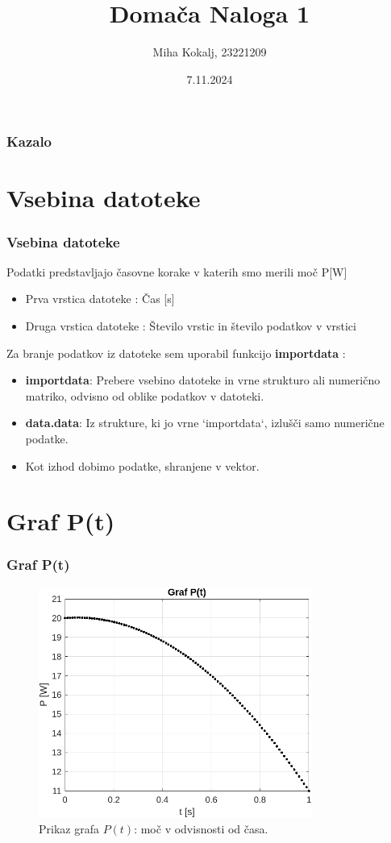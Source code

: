 \documentclass[10pt]{beamer}
\title{Domača Naloga 1}
\author{Miha Kokalj, 23221209}
\institute{Fakulteta za strojništvo, Univerza v Ljubljani}
\date{7.11.2024}
\begin{document}
 
\frame{\titlepage}

\begin{frame}
\frametitle{Kazalo}
 \tableofcontents[sectionstyle=show, subsectionstyle=show]
 
\end{frame}

\section{Vsebina datoteke}
\begin{frame}
\frametitle{Vsebina datoteke}
Podatki predstavljajo časovne korake v katerih smo merili moč P[W]
\begin{itemize}
    \item Prva vrstica datoteke : Čas [s]
    \item Druga vrstica datoteke : Število vrstic in število podatkov v vrstici
\end{itemize}

\vspace{5pt}
Za branje podatkov iz datoteke sem uporabil funkcijo \textbf{importdata} :
\begin{itemize}
    \item \textbf{importdata}: Prebere vsebino datoteke in vrne strukturo ali numerično matriko, odvisno od oblike podatkov v datoteki.  
\item \textbf{data.data}: Iz strukture, ki jo vrne `importdata`, izlušči samo numerične podatke.
    \item Kot izhod dobimo podatke, shranjene v vektor.
\end{itemize}
\end{frame}

\section{Graf P(t)}
\begin{frame}
\frametitle{Graf P(t)}
\begin{figure}
    \centering
    \includegraphics[width=0.8\textwidth]{graf_P(t).png} 
    \caption{Prikaz grafa \( P(t) \): moč v odvisnosti od časa.}
    \label{fig:P_t}
\end{figure}
\end{frame}
\end{document}
